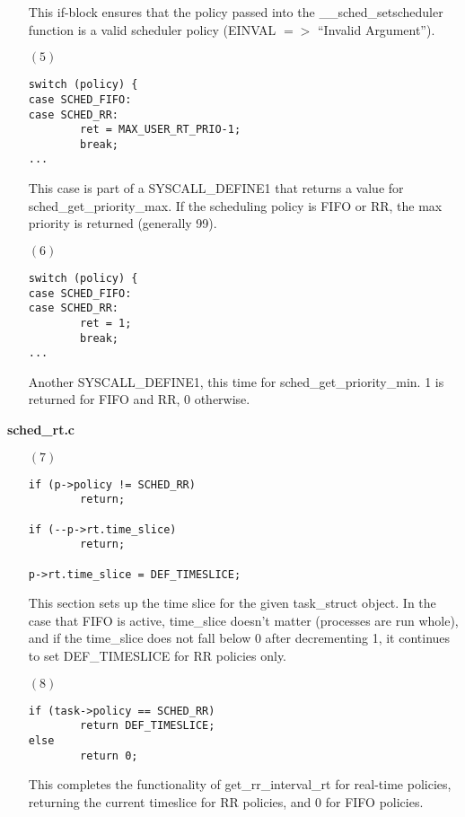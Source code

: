 \documentclass[letterpaper,10pt]{article}
\begin{document}
\begin{enumerate}
\begin{verbatim}
\end{verbatim}
This if-block ensures that the policy passed into the \_\_sched\_setscheduler function is a valid scheduler policy (EINVAL $=>$ “Invalid Argument”).

\item[$(5)$]
\begin{verbatim} 
switch (policy) {
case SCHED_FIFO:
case SCHED_RR:
        ret = MAX_USER_RT_PRIO-1;
        break;
...

\end{verbatim}
This case is part of a SYSCALL\_DEFINE1 that returns a value for sched\_get\_priority\_max. If the scheduling policy is FIFO or RR, the max priority is returned (generally 99).

\item[$(6)$]
\begin{verbatim} 
switch (policy) {
case SCHED_FIFO:
case SCHED_RR:
        ret = 1;
        break;
...

\end{verbatim}
Another SYSCALL\_DEFINE1, this time for sched\_get\_priority\_min. 1 is returned for FIFO and RR, 0 otherwise.
\end{enumerate}
\textbf{sched\_rt.c}
\begin{enumerate}
\item[$(7)$]
\begin{verbatim} 
if (p->policy != SCHED_RR)
        return;
 
if (--p->rt.time_slice)
        return;

p->rt.time_slice = DEF_TIMESLICE;

\end{verbatim}

This section sets up the time slice for the given task\_struct object. In the case that FIFO is active, time\_slice doesn’t matter (processes are run whole), and if the time\_slice does not fall below 0 after decrementing 1, it continues to set DEF\_TIMESLICE for RR policies only. 

\item[$(8)$]
\begin{verbatim} 
if (task->policy == SCHED_RR)
        return DEF_TIMESLICE;
else
        return 0;

\end{verbatim}

This completes the functionality of get\_rr\_interval\_rt for real-time policies, returning the current timeslice for RR policies, and 0 for FIFO policies.

\end{enumerate}
\end{document}
